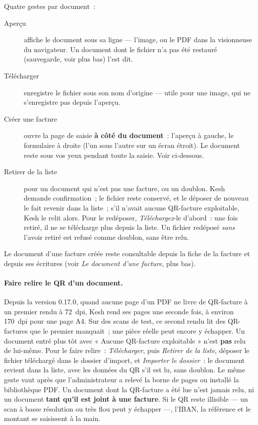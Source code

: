 \documentclass[a4paper,11pt,oneside]{article}
\begin{document}
Quatre gestes par document~:
\begin{description}
    \item[Aperçu] affiche le document sous sa ligne --- l'image, ou le PDF dans la
          visionneuse du navigateur. Un document dont le fichier n'a pas été restauré
          (sauvegarde, voir plus bas) l'est dit.
    \item[Télécharger] enregistre le fichier sous son nom d'origine --- utile pour une
          image, qui ne s'enregistre pas depuis l'aperçu.
    \item[Créer une facture] ouvre la page de saisie \textbf{à côté du document}~: l'aperçu
          à gauche, le formulaire à droite (l'un sous l'autre sur un écran étroit). Le
          document reste sous vos yeux pendant toute la saisie. Voir ci-dessous.
    \item[Retirer de la liste] pour un document qui n'est pas une facture, ou un doublon.
          Kesh demande confirmation~; le fichier reste conservé, et le déposer de nouveau
          le fait revenir dans la liste~; s'il n'avait aucune QR-facture exploitable, Kesh
          le relit alors. Pour le redéposer, \emph{Téléchargez}-le d'abord~: une fois retiré,
          il ne se télécharge plus depuis la liste. Un fichier redéposé \emph{sans} l'avoir
          retiré est refusé comme doublon, sans être relu.
\end{description}
Le document d'une facture créée reste consultable depuis la fiche de la facture et depuis
ses écritures (voir \emph{Le document d'une facture}, plus bas).

\paragraph{Faire relire le QR d'un document.} Depuis la version 0.17.0, quand aucune page
d'un PDF ne livre de QR-facture à un premier rendu à 72~dpi, Kesh rend ses pages une seconde
fois, à environ 170~dpi pour une page A4. Sur des scans de test, ce second rendu lit des
QR-factures que le premier manquait~; une pièce réelle peut encore y échapper. Un document entré plus tôt avec « Aucune QR-facture exploitable »
n'est \textbf{pas} relu de lui-même. Pour le faire relire~: \emph{Télécharger}, puis
\emph{Retirer de la liste}, déposer le fichier téléchargé dans le dossier d'import, et
\emph{Importer le dossier}~: le document revient dans la liste, avec les données du QR s'il
est lu, sans doublon. Le même geste vaut après que l'administrateur a relevé la borne de
pages ou installé la bibliothèque PDF. Un document dont la QR-facture a été lue n'est jamais
relu, ni un document \textbf{tant qu'il est joint à une facture}. Si le QR reste illisible
--- un scan à basse résolution ou très flou peut y échapper ---, l'IBAN, la référence et le
montant se saisissent à la main.
\end{document}

